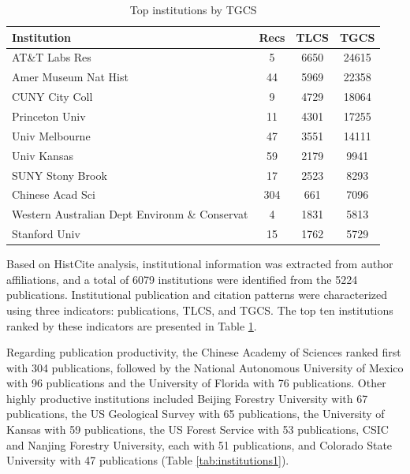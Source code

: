 \documentclass[authoryear,preprint,review,12pt]{elsarticle}
\begin{document}
\begin{table}[htbp]
\vspace{0.4cm}

\begin{subtable}{\textwidth}
\centering
\caption{Top institutions by TGCS}
\label{tab:institutions3}
\renewcommand{\arraystretch}{0.6}
\small
\begin{tabular}{p{9cm} c c c}
\toprule
Institution & Recs & TLCS & TGCS\\
\midrule
AT\&T Labs Res & 5 & 6650 & 24615\\
Amer Museum Nat Hist & 44 & 5969 & 22358\\
CUNY City Coll & 9 & 4729 & 18064\\
Princeton Univ & 11 & 4301 & 17255\\
Univ Melbourne & 47 & 3551 & 14111\\
Univ Kansas & 59 & 2179 & 9941\\
SUNY Stony Brook & 17 & 2523 & 8293\\
Chinese Acad Sci & 304 & 661 & 7096\\
Western Australian Dept Environm \& Conservat & 4 & 1831 & 5813\\
Stanford Univ & 15 & 1762 & 5729\\
\bottomrule
\end{tabular}
\end{subtable}

\label{tab:institutions}
\end{table}

Based on HistCite analysis, institutional information was extracted from author affiliations, and a total of 6079 institutions were identified from the 5224 publications. Institutional publication and citation patterns were characterized using three indicators: publications, TLCS, and TGCS. The top ten institutions ranked by these indicators are presented in Table \ref{tab:institutions}.

Regarding publication productivity, the Chinese Academy of Sciences ranked first with 304 publications, followed by the National Autonomous University of Mexico with 96 publications and the University of Florida with 76 publications. Other highly productive institutions included Beijing Forestry University with 67 publications, the US Geological Survey with 65 publications, the University of Kansas with 59 publications, the US Forest Service with 53 publications, CSIC and Nanjing Forestry University, each with 51 publications, and Colorado State University with 47 publications (Table \ref{tab:institutions1}).
\end{document}
